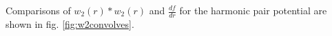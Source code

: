 \documentclass[letterpaper,twocolumn,amsmath,amssymb,prb]{revtex4-1}
\newcommand{\rr}{\textbf{r}}
\begin{document}
Comparisons of $w_2(r)\ast w_2(r)$ and $\frac{df}{dr}$ for the harmonic
pair potential are shown in fig. \ref{fig:w2convolves}.


\end{document}

